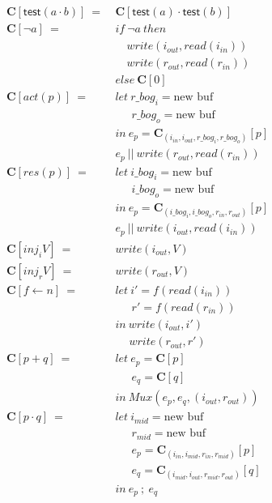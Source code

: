 \documentclass[12pt, letterpaper]{article}
\begin{document}
{\begin{align*}
    \mathbf{C}[\mathsf{test}(a \cdot b)]\ 
       =\ &\mathbf{C}[\mathsf{test}(a) \cdot \mathsf{test}(b)] \\
    \mathbf{C}[\neg a]\ 
       =\ 
       &if\ \neg a\ then\\
       &\quad write(i_{out}, read(i_{in}))\\
       &\quad write(r_{out}, read(r_{in}))\\
       &else\ \mathbf{C}[0]\\
    \mathbf{C}[act(p)]\ 
      =\ &
      let\ r\_bog_i = \text{new buf}\\
      &\quad\ \ r\_bog_o = \text{new buf}\\
      &in\ e_p = \mathbf{C}_{(i_{in}, i_{out}, r\_bog_i, r\_bog_o)}[p]\\
      &e_p\ ||\ write(r_{out}, read(r_{in}))
      \\
    \mathbf{C}[res(p)]\ 
      =\ &
      let\ i\_bog_i = \text{new buf}\\
      &\quad\ \ i\_bog_o = \text{new buf}\\
      &in\ e_p = \mathbf{C}_{(i\_bog_i, i\_bog_o, r_{in}, r_{out})}[p]\\
      &e_p\ ||\ write(i_{out}, read(i_{in}))
      \\
    \mathbf{C}[inj_iV]\ 
      =\ &
      write(i_{out}, V)
      \\
    \mathbf{C}[inj_rV]\ 
      =\ &
      write(r_{out}, V)
      \\
    \mathbf{C}[f \leftarrow n]\ 
      =\ &
      let\ i' = f(read(i_{in}))\\
      &\quad\ \ r' = f(read(r_{in}))\\
      &in\ write(i_{out}, i')\\
      &\quad \ write(r_{out}, r')
      \\
    \mathbf{C}[p + q]\ 
      =\ &
      let\ e_p = \mathbf{C}[p]\\
      &\quad\ \ e_q = \mathbf{C}[q]\\
      &in\ Mux(e_p, e_q, (i_{out},r_{out}))
      \\
    \mathbf{C}[p \cdot q]\ 
      =\ &
      let\ i_{mid} = \text{new buf}\\
      &\quad\ \ r_{mid} = \text{new buf}\\
      &\quad\ \ e_p = \mathbf{C}_{(i_{in}, i_{mid}, r_{in}, r_{mid})}[p]\\
      &\quad\ \ e_q = \mathbf{C}_{(i_{mid}, i_{out}, r_{mid}, r_{out})}[q]\\
      &in\ e_p\ ;\ e_q
  \end{align*}
 }
\end{document}
